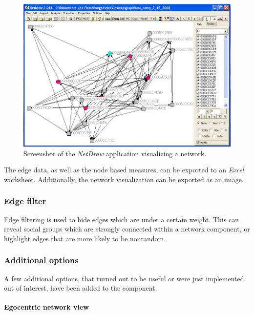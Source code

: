 \begin{figure}[htpb]
\begin{center}
  \includegraphics[width=\textwidth]{assets/img/netdraw_export_component.png}
  \caption[Scereenshot of the Netdraw application]{Screenshot of the \textit{NetDraw} application visualizing a network.}
  \label{fig:netdraw_export_component}
\end{center}
\end{figure}

The edge data, as well as the node based measures, can be exported to an \textit{Excel} worksheet. Additionally, the network visualization can be exported as an image.

\subsubsection*{Edge filter}

Edge filtering is used to hide edges which are under a certain weight. This can reveal social groups which are strongly connected within a network component, or highlight edges that are more likely to be nonrandom.

\subsubsection*{Additional options}

A few additional options, that turned out to be useful or were just implemented out of interest, have been added to the component.

\paragraph{Egocentric network view}

